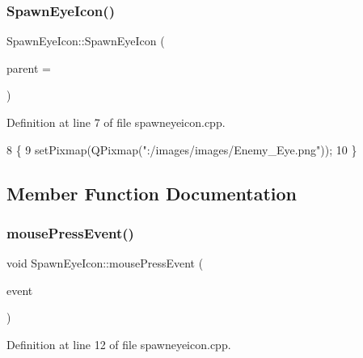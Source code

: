 \subsubsection{\texorpdfstring{Spawn\+Eye\+Icon()}{SpawnEyeIcon()}}
{\footnotesize\ttfamily Spawn\+Eye\+Icon\+::\+Spawn\+Eye\+Icon (\begin{DoxyParamCaption}\item[{Q\+Graphics\+Item $\ast$}]{parent = {} }\end{DoxyParamCaption})}



Definition at line 7 of file spawneyeicon.\+cpp.


\begin{DoxyCode}
8 \{
9     setPixmap(QPixmap(\textcolor{stringliteral}{":/images/images/Enemy\_Eye.png"}));
10 \}
\end{DoxyCode}


\subsection{Member Function Documentation}
\mbox{\label{class_spawn_eye_icon_a7fce32d9b81bdd2a5732372db0c928f0}} 
\subsubsection{\texorpdfstring{mouse\+Press\+Event()}{mousePressEvent()}}
{\footnotesize\ttfamily void Spawn\+Eye\+Icon\+::mouse\+Press\+Event (\begin{DoxyParamCaption}\item[{Q\+Graphics\+Scene\+Mouse\+Event $\ast$}]{event }\end{DoxyParamCaption})}



Definition at line 12 of file spawneyeicon.\+cpp.


